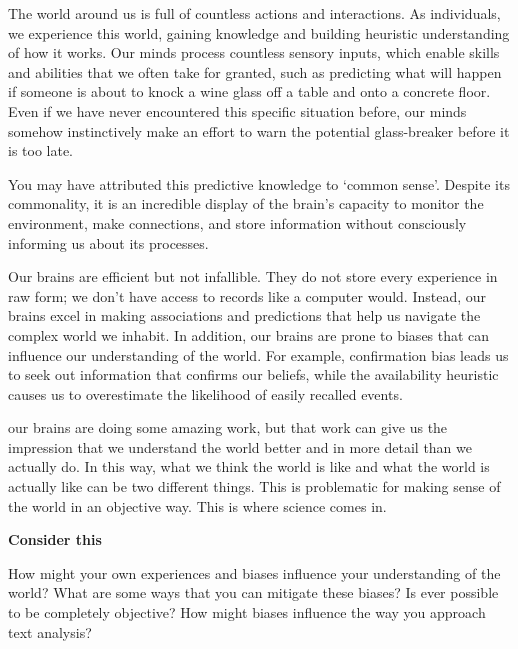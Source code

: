 \documentclass[
  letterpaper,
]{latex/krantz}
\theoremstyle{definition}
\theoremstyle{remark}
\begin{document}
The world around us is full of countless actions and interactions. As
individuals, we experience this world, gaining knowledge and building
heuristic understanding of how it works. Our minds process countless
sensory inputs, which enable skills and abilities that we often take for
granted, such as predicting what will happen if someone is about to
knock a wine glass off a table and onto a concrete floor. Even if we
have never encountered this specific situation before, our minds somehow
instinctively make an effort to warn the potential glass-breaker before
it is too late.

You may have attributed this predictive knowledge to `common sense'.
Despite its commonality, it is an incredible display of the brain's
capacity to monitor the environment, make connections, and store
information without consciously informing us about its processes.

Our brains are efficient but not infallible. They do not store every
experience in raw form; we don't have access to records like a computer
would. Instead, our brains excel in making associations and predictions
that help us navigate the complex world we inhabit. In addition, our
brains are prone to biases that can influence our understanding of the
world. For example, confirmation bias leads us to seek out information
that confirms our beliefs, while the availability heuristic causes us to
overestimate the likelihood of easily recalled events.

our brains are doing some amazing work, but that work can give us the
impression that we understand the world better and in more detail than
we actually do. In this way, what we think the world is like and what
the world is actually like can be two different things. This is
problematic for making sense of the world in an objective way. This is
where science comes in.

\begin{tcolorbox}[enhanced jigsaw, colframe=quarto-callout-color-frame, breakable, bottomrule=.15mm, arc=.35mm, left=2mm, opacityback=0, rightrule=.15mm, colback=white, toprule=.15mm, leftrule=.75mm]

\textbf{ Consider this}

How might your own experiences and biases influence your understanding
of the world? What are some ways that you can mitigate these biases? Is
ever possible to be completely objective? How might biases influence the
way you approach text analysis?

\end{tcolorbox}
\end{document}
